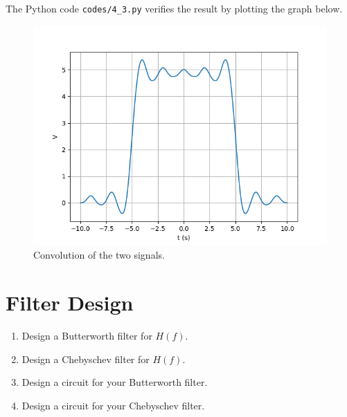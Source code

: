 \documentclass[journal,12pt,twocolumn]{IEEEtran}
\renewcommand\thesection{\arabic{section}}
\begin{document}
\begin{enumerate}[label=\thesection.\arabic*
,ref=\thesection.\theenumi]
\solution The Python code \texttt{codes/4\_3.py} verifies the result
by plotting the graph below.
\begin{figure}[!ht]
    \includegraphics[width=\columnwidth]{figs/4_3.png}
    \caption{Convolution of the two signals.}
    \label{eq:fig-conv}
\end{figure}
\end{enumerate}
\section{Filter Design}
\begin{enumerate}[label=\thesection.\arabic*
,ref=\thesection.\theenumi]
\item Design a Butterworth filter for $H(f)$.

\solution
\item Design a Chebyschev filter for $H(f)$.

\solution
\item Design a circuit for your Butterworth filter.

\solution
\item Design a circuit for your Chebyschev filter.

\solution
\end{enumerate}
\end{document}
